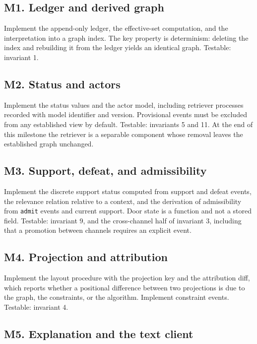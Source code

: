 \documentclass[11pt]{article}
\newcommand{\ev}[1]{\texttt{#1}}
\begin{document}
\subsection*{M1. Ledger and derived graph}

Implement the append-only ledger, the effective-set computation, and the interpretation into a graph index. The key property is determinism: deleting the index and rebuilding it from the ledger yields an identical graph. Testable: invariant 1.

\subsection*{M2. Status and actors}

Implement the status values and the actor model, including retriever processes recorded with model identifier and version. Provisional events must be excluded from any established view by default. Testable: invariants 5 and 11. At the end of this milestone the retriever is a separable component whose removal leaves the established graph unchanged.

\subsection*{M3. Support, defeat, and admissibility}

Implement the discrete support status computed from support and defeat events, the relevance relation relative to a context, and the derivation of admissibility from \ev{admit} events and current support. Door state is a function and not a stored field. Testable: invariant 9, and the cross-channel half of invariant 3, including that a promotion between channels requires an explicit event.

\subsection*{M4. Projection and attribution}

Implement the layout procedure with the projection key and the attribution diff, which reports whether a positional difference between two projections is due to the graph, the constraints, or the algorithm. Implement constraint events. Testable: invariant 4.

\subsection*{M5. Explanation and the text client}
\end{document}
